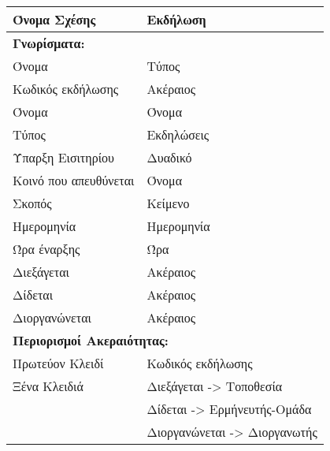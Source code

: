\begin{tabular}{|p{6cm}|p{8cm}|}
  \hline
  Όνομα Σχέσης          & Εκδήλωση                         \\ \hline
  \multicolumn{2}{|l|}{\textbf{Γνωρίσματα:}}               \\ \hline
  Όνομα                 & Τύπος                            \\ \hline
  Κωδικός εκδήλωσης     & Ακέραιος                         \\ \hline
  Όνομα                 & Όνομα                            \\ \hline
  Τύπος                 & Εκδηλώσεις                       \\ \hline
  Ύπαρξη Εισιτηρίου     & Δυαδικό                          \\ \hline
  Κοινό που απευθύνεται & Όνομα                            \\ \hline
  Σκοπός                & Κείμενο                          \\ \hline
  Ημερομηνία            & Ημερομηνία                       \\ \hline
  Ώρα έναρξης           & Ώρα                              \\ \hline
  Διεξάγεται            & Ακέραιος                         \\ \hline
  Δίδεται               & Ακέραιος                         \\ \hline
  Διοργανώνεται         & Ακέραιος                         \\ \hline
  \multicolumn{2}{|l|}{\textbf{Περιορισμοί Ακεραιότητας:}} \\ \hline
  Πρωτεύον Κλειδί       & Κωδικός εκδήλωσης                \\ \hline
  Ξένα Κλειδιά          & Διεξάγεται -> Τοποθεσία          \\ \cline{2-2}
                        & Δίδεται -> Ερμήνευτής-Ομάδα      \\ \cline{2-2}
                        & Διοργανώνεται -> Διοργανωτής     \\ \hline
\end{tabular}

